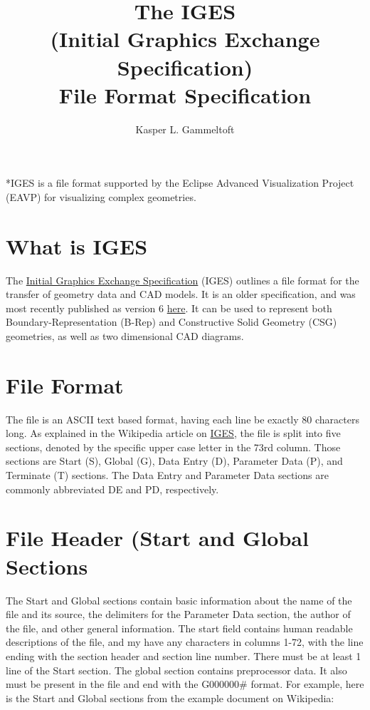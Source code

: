 \title{The IGES \\ (Initial Graphics Exchange Specification)\\ File Format Specification}

\author{Kasper L. Gammeltoft}

\maketitle

*IGES is a file format supported by the Eclipse Advanced Visualization
Project (EAVP) for visualizing complex geometries.

\section*{What is IGES}\label{what-is-iges}

The \href{https://en.wikipedia.org/wiki/IGES}{Initial Graphics Exchange
Specification} (IGES) outlines a file format for the transfer of
geometry data and CAD models. It is an older specification, and was most
recently published as version 6
\href{https://filemonger.com/specs/igs/devdept.com/version6.pdf}{here}.
It can be used to represent both Boundary-Representation (B-Rep) and
Constructive Solid Geometry (CSG) geometries, as well as two dimensional
CAD diagrams.

\section*{File Format}\label{file-format}

The file is an ASCII text based format, having each line be exactly 80
characters long. As explained in the Wikipedia article on
\href{https://en.wikipedia.org/wiki/IGES}{IGES}, the file is split into
five sections, denoted by the specific upper case letter in the 73rd
column. Those sections are Start (S), Global (G), Data Entry (D),
Parameter Data (P), and Terminate (T) sections. The Data Entry and
Parameter Data sections are commonly abbreviated DE and PD,
respectively.

\section*{File Header (Start and Global
Sections}\label{file-header-start-and-global-sections}

The Start and Global sections contain basic information about the name
of the file and its source, the delimiters for the Parameter Data
section, the author of the file, and other general information. The
start field contains human readable descriptions of the file, and my
have any characters in columns 1-72, with the line ending with the
section header and section line number. There must be at least 1 line of
the Start section. The global section contains preprocessor data. It
also must be present in the file and end with the G000000\# format. For
example, here is the Start and Global sections from the example document
on Wikipedia:

